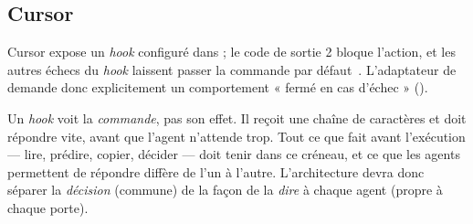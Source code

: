 \subsection{Cursor}
Cursor expose un \textit{hook}  configuré dans
 ; le code de sortie 2 bloque l'action, et les autres échecs du
\textit{hook} laissent passer la commande par défaut~\cite{cursor-hooks}. L'adaptateur de
\demo{} demande donc explicitement un comportement « fermé en cas d'échec »
().

\begin{pourquoi}
Un \textit{hook} voit la \emph{commande}, pas son effet. Il reçoit une chaîne de caractères
et doit répondre vite, avant que l'agent n'attende trop. Tout ce que \demo{} fait avant
l'exécution --- lire, prédire, copier, décider --- doit tenir dans ce créneau, et ce que les
agents permettent de répondre diffère de l'un à l'autre. L'architecture devra donc séparer
la \emph{décision} (commune) de la façon de la \emph{dire} à chaque agent (propre à chaque
porte).
\end{pourquoi}
